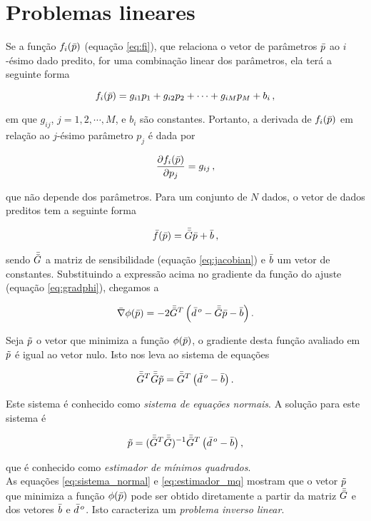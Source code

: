\section{Problemas lineares}

Se a função $f_i(\bar{p})$ (equação \ref{eq:fi}), que relaciona o vetor de
parâmetros $\bar{p}$ ao $i$-ésimo dado predito, for uma combinação linear dos
parâmetros, ela terá a seguinte forma

\begin{equation}
f_i(\bar{p}) = g_{i1}p_1 + g_{i2}p_2 + \dotsb + g_{iM}p_M + b_i \thinspace ,
\label{eq:comb_linear}
\end{equation}

\noindent em que $g_{ij}$, $j = 1, 2, \cdots, M$, e $b_i$ são constantes.
Portanto, a derivada de $f_i(\bar{p})$ em relação ao $j$-ésimo parâmetro
$p_j$ é dada por

\begin{equation}
\dfrac{\partial f_i(\bar{p})}{\partial p_j} = g_{ij} \thinspace ,
\end{equation}

\noindent que não depende dos parâmetros. Para um conjunto de $N$ dados, o vetor
de dados preditos tem a seguinte forma

\begin{equation}
\bar{f}(\bar{p}) = \bar{\bar{G}}\bar{p} + \bar{b} \thinspace ,
\label{eq:f_igual_Gp}
\end{equation}

\noindent sendo $\bar{\bar{G}}$ a matriz de sensibilidade (equação \ref{eq:jacobian})
e $\bar{b}$ um vetor de constantes.
Substituindo a expressão acima no gradiente da função do ajuste (equação
\ref{eq:gradphi}), chegamos a

\begin{equation}
\bar{\nabla}\phi(\bar{p}) = -2\bar{\bar{G}}^T \left(\bar{d}^{\thinspace o} -
    \bar{\bar{G}}\bar{p} - \bar{b} \right).
\end{equation}

\indent Seja $\tilde{p}$ o vetor que minimiza a função $\phi(\bar{p})$, o
gradiente desta função avaliado em $\tilde{p}$ é igual ao vetor nulo.
Isto nos leva ao sistema de equações

\begin{equation}
\bar{\bar{G}}^T\bar{\bar{G}}\tilde{p} = \bar{\bar{G}}^T\left(\bar{d}^{\thinspace o} - \bar{b} \right).
\label{eq:sistema_normal}
\end{equation}

\noindent Este sistema é conhecido como {\it sistema de equações normais}. A
solução para este sistema é

\begin{equation}
\tilde{p} = (\bar{\bar{G}}^T\bar{\bar{G}})^{-1} \bar{\bar{G}}^T
    \left(\bar{d}^{\thinspace o} - \bar{b} \right),
\label{eq:estimador_mq}
\end{equation}

\noindent que é conhecido como {\it estimador de mínimos quadrados}.
\\
\indent As equações \ref{eq:sistema_normal} e \ref{eq:estimador_mq} mostram que 
o vetor $\tilde{p}$ que minimiza a função $\phi(\bar{p})$ pode ser
obtido diretamente a partir da matriz $\bar{\bar{G}}$ e dos vetores $\bar{b}$ e
$\bar{d}^{\thinspace o}$. Isto caracteriza um {\it problema inverso linear}.
